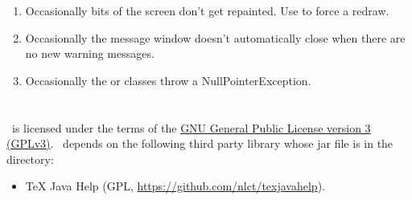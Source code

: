 \begin{enumerate}
\item Occasionally bits of the screen don't get repainted.
Use  to force a redraw.

\item Occasionally the message window doesn't automatically close
when there are no new warning messages.

\item Occasionally the  or 
classes throw a NullPointerException.

\end{enumerate}

\chapter{}
\label{sec:licence}

%
\FlowframTk\ is licensed under the terms of the 
\href{https://www.gnu.org/licenses/gpl-3.0.html}{GNU General
Public License version 3 (GPLv3)}.
\FlowframTk\ depends on the following third party library whose
jar file is in the  directory:
\begin{itemize}
   \item TeX Java Help 
   (GPL, \url{https://github.com/nlct/texjavahelp}).
\end{itemize}





\printmain
\printindex 

 

